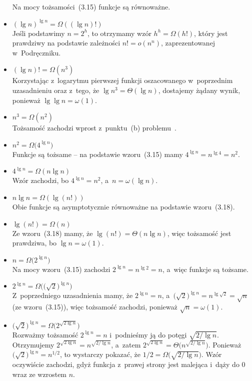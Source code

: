 \begin{itemize}
	Na mocy tożsamości~(3.15) funkcje są równoważne.
\item $(\lg n)^{\lg n}=\Omega((\lg n)!)$ \\
	Jeśli podstawimy $n=2^h$, to otrzymamy wzór $h^h=\Omega(h!)$, który jest prawdziwy na podstawie zależności $n!=o(n^n)$, zaprezentowanej w~Podręczniku.
\item $(\lg n)!=\Omega(n^3)$ \\
	Korzystając z~logarytmu pierwszej funkcji oszacowanego w~poprzednim uzasadnieniu oraz z~tego, że $\lg n^3=\Theta(\lg n)$, dostajemy żądany wynik, ponieważ $\lg\lg n=\omega(1)$.
\item $n^3=\Omega(n^2)$ \\
	Tożsamość zachodzi wprost z~punktu~(b) problemu~.
\item $n^2=\Omega\bigl(4^{\lg n}\bigr)$ \\
	Funkcje są tożsame -- na podstawie wzoru~(3.15) mamy $4^{\lg n}=n^{\lg4}=n^2$.
\item $4^{\lg n}=\Omega(n\lg n)$ \\
	Wzór zachodzi, bo $4^{\lg n}=n^2$, a~$n=\omega(\lg n)$.
\item $n\lg n=\Omega(\lg(n!))$ \\
	Obie funkcje są asymptotycznie równoważne na podstawie wzoru~(3.18).
\item $\lg(n!)=\Omega(n)$ \\
	Ze wzoru~(3.18) mamy, że $\lg(n!)=\Theta(n\lg n)$, więc tożsamość jest prawdziwa, bo $\lg n=\omega(1)$.
\item $n=\Omega\bigl(2^{\lg n}\bigr)$ \\
	Na mocy wzoru~(3.15) zachodzi $2^{\lg n}=n^{\lg2}=n$, a~więc funkcje są tożsame.
\item $2^{\lg n}=\Omega\bigl(\!\bigl(\!\sqrt{2}\bigr)^{\lg n}\bigr)$ \\
	Z~poprzedniego uzasadnienia mamy, że $2^{\lg n}=n$, a~$\bigl(\!\sqrt{2}\bigr)^{\lg n}=n^{\lg\sqrt{2}}=\sqrt{n}$ (ze wzoru~(3.15)), więc tożsamość zachodzi, ponieważ $\sqrt{n}=\omega(1)$.
\item $\bigl(\!\sqrt{2}\bigr)^{\lg n}=\Omega\bigl(2^{\sqrt{2\lg n}}\bigr)$ \\
	Rozważmy tożsamość $2^{\lg n}=n$ i~podnieśmy ją do potęgi $\sqrt{2/\!\lg n}$. Otrzymujemy $2^{\sqrt{2\lg n}}=n^{\sqrt{2/\!\lg n}}$, a~zatem $2^{\sqrt{2\lg n}}=\Theta\bigl(n^{\sqrt{2/\!\lg n}}\bigr)$. Ponieważ $\bigl(\!\sqrt{2}\bigr)^{\lg n}=n^{1/2}$, to wystarczy pokazać, że $1/2=\Omega\bigl(\!\sqrt{2/\!\lg n}\bigr)$. Wzór oczywiście zachodzi, gdyż funkcja z~prawej strony jest malejąca i~dąży do 0 wraz ze wzrostem $n$.

\end{itemize}
